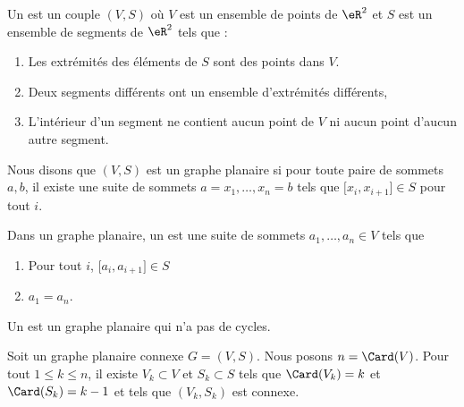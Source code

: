 \begin{definition}	\label{DEFooBBXEooKVtuTc}
	Un  est un couple \( (V,S)\) où \( V\) est un ensemble de points de \( \eR^2\) et \( S\) est un ensemble de segments de \( \eR^2\) tels que :
	\begin{enumerate}
		\item
		      Les extrémités des éléments de \( S\) sont des points dans \( V\).
		\item
		      Deux segments différents ont un ensemble d'extrémités différents,
		\item
		      L'intérieur d'un segment ne contient aucun point de \( V\) ni aucun point d'aucun autre segment.
	\end{enumerate}
\end{definition}

\begin{definition}	\label{DEFooPDPWooFDcUcr}
	Nous disons que \( (V,S)\) est un graphe planaire  si pour toute paire de sommets \( a,b\), il existe une suite de sommets \( a=x_1,\ldots,x_n=b\) tels que \( \mathopen[ x_i,x_{i+1}\mathclose]\in S\) pour tout \( i\).
\end{definition}

\begin{definition}	\label{DEFooXWIYooILrgLL}
	Dans un graphe planaire, un  est une suite de sommets \( a_1,\ldots,a_n\in V\) tels que
	\begin{enumerate}
		\item
		      Pour tout \( i\), \( \mathopen[ a_i,a_{i+1}\mathclose]\in S\)
		\item
		      \( a_1=a_n\).
	\end{enumerate}
\end{definition}

\begin{definition}	\label{DEFooYTGWooAULOGa}
	Un  est un graphe planaire qui n'a pas de cycles.
\end{definition}


\begin{lemma}	\label{LEMooUHDFooFAukfG}
	Soit un graphe planaire connexe \( G=(V,S)\). Nous posons \( n=\Card(V)\). Pour tout \( 1\leq k\leq n\), il existe \( V_k\subset V\) et \( S_k\subset S\) tels que \( \Card(V_k)=k\) et \( \Card(S_k)=k-1\) et tels que \( (V_k,S_k)\) est connexe.
\end{lemma}


